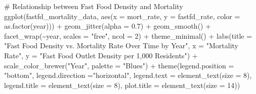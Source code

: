 \documentclass[
  letterpaper,
  DIV=11,
  numbers=noendperiod]{scrartcl}
\newenvironment{Shaded}{\begin{snugshade}}{\end{snugshade}}
\newcommand{\AttributeTok}[1]{\textcolor[rgb]{0.40,0.45,0.13}{#1}}
\newcommand{\CommentTok}[1]{\textcolor[rgb]{0.37,0.37,0.37}{#1}}
\newcommand{\DecValTok}[1]{\textcolor[rgb]{0.68,0.00,0.00}{#1}}
\newcommand{\FloatTok}[1]{\textcolor[rgb]{0.68,0.00,0.00}{#1}}
\newcommand{\FunctionTok}[1]{\textcolor[rgb]{0.28,0.35,0.67}{#1}}
\newcommand{\NormalTok}[1]{\textcolor[rgb]{0.00,0.23,0.31}{#1}}
\newcommand{\SpecialCharTok}[1]{\textcolor[rgb]{0.37,0.37,0.37}{#1}}
\newcommand{\StringTok}[1]{\textcolor[rgb]{0.13,0.47,0.30}{#1}}
\begin{document}
\begin{Shaded}
\begin{Highlighting}[]
\CommentTok{\# Relationship between Fast Food Density and Mortality }
\FunctionTok{ggplot}\NormalTok{(fastfd\_mortality\_data, }\FunctionTok{aes}\NormalTok{(}\AttributeTok{x =}\NormalTok{ mort\_rate, }\AttributeTok{y =}\NormalTok{ fastfd\_rate, }\AttributeTok{color =} \FunctionTok{as.factor}\NormalTok{(year))) }\SpecialCharTok{+}
  \FunctionTok{geom\_jitter}\NormalTok{(}\AttributeTok{alpha =} \FloatTok{0.7}\NormalTok{) }\SpecialCharTok{+}
  \FunctionTok{geom\_smooth}\NormalTok{() }\SpecialCharTok{+}
 \FunctionTok{facet\_wrap}\NormalTok{(}\SpecialCharTok{\textasciitilde{}}\NormalTok{year, }\AttributeTok{scales =} \StringTok{"free"}\NormalTok{, }\AttributeTok{ncol =} \DecValTok{2}\NormalTok{) }\SpecialCharTok{+}
  \FunctionTok{theme\_minimal}\NormalTok{() }\SpecialCharTok{+}
  \FunctionTok{labs}\NormalTok{(}\AttributeTok{title =} \StringTok{"Fast Food Density vs. Mortality Rate Over Time by Year"}\NormalTok{,}
       \AttributeTok{x =} \StringTok{"Mortality Rate"}\NormalTok{,}
       \AttributeTok{y =} \StringTok{"Fast Food Outlet Density per 1,000 Residents"}\NormalTok{) }\SpecialCharTok{+}
  \FunctionTok{scale\_color\_brewer}\NormalTok{(}\StringTok{"Year"}\NormalTok{, }\AttributeTok{palette =} \StringTok{"Blues"}\NormalTok{) }\SpecialCharTok{+}
  \FunctionTok{theme}\NormalTok{(}\AttributeTok{legend.position =} \StringTok{"bottom"}\NormalTok{, }
        \AttributeTok{legend.direction =}\StringTok{"horizontal"}\NormalTok{,}
        \AttributeTok{legend.text =} \FunctionTok{element\_text}\NormalTok{(}\AttributeTok{size =} \DecValTok{8}\NormalTok{),}
        \AttributeTok{legend.title =} \FunctionTok{element\_text}\NormalTok{(}\AttributeTok{size =} \DecValTok{8}\NormalTok{),}
        \AttributeTok{plot.title =} \FunctionTok{element\_text}\NormalTok{(}\AttributeTok{size =} \DecValTok{14}\NormalTok{)) }


\end{Highlighting}
\end{Shaded}
\end{document}
